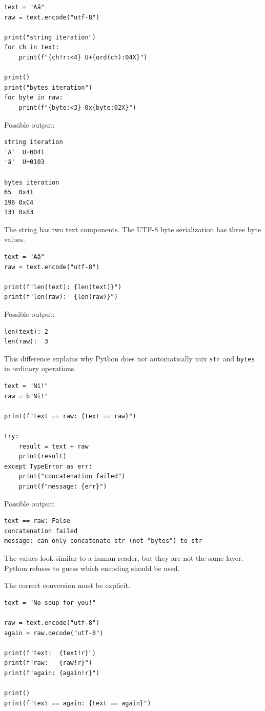 \begin{verbatim}
text = "Aă"
raw = text.encode("utf-8")

print("string iteration")
for ch in text:
    print(f"{ch!r:<4} U+{ord(ch):04X}")

print()
print("bytes iteration")
for byte in raw:
    print(f"{byte:<3} 0x{byte:02X}")
\end{verbatim}

Possible output:

\begin{verbatim}
string iteration
'A'  U+0041
'ă'  U+0103

bytes iteration
65  0x41
196 0xC4
131 0x83
\end{verbatim}

The string has two text components. The UTF-8 byte serialization has three byte values.

\begin{verbatim}
text = "Aă"
raw = text.encode("utf-8")

print(f"len(text): {len(text)}")
print(f"len(raw):  {len(raw)}")
\end{verbatim}

Possible output:

\begin{verbatim}
len(text): 2
len(raw):  3
\end{verbatim}

This difference explains why Python does not automatically mix \texttt{str} and \texttt{bytes} in ordinary operations.

\begin{verbatim}
text = "Ni!"
raw = b"Ni!"

print(f"text == raw: {text == raw}")

try:
    result = text + raw
    print(result)
except TypeError as err:
    print("concatenation failed")
    print(f"message: {err}")
\end{verbatim}

Possible output:

\begin{verbatim}
text == raw: False
concatenation failed
message: can only concatenate str (not "bytes") to str
\end{verbatim}

The values look similar to a human reader, but they are not the same layer. Python refuses to guess which encoding should be used.

The correct conversion must be explicit.

\begin{verbatim}
text = "No soup for you!"

raw = text.encode("utf-8")
again = raw.decode("utf-8")

print(f"text:  {text!r}")
print(f"raw:   {raw!r}")
print(f"again: {again!r}")

print()
print(f"text == again: {text == again}")
\end{verbatim}

